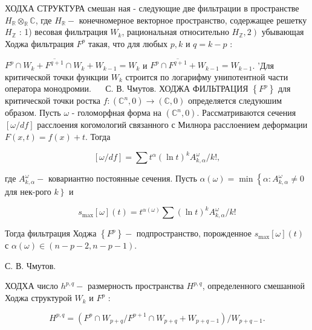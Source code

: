 \documentclass[10pt]{article}
\begin{document}
ХОДХА СТРУКТУРА смешан ная - следующие две фильтрации в пространстве $H_{\mathbb{R}} \otimes_{\mathbb{R}} \mathbb{C}$, где $H_{\mathbb{R}}-$ конечномерное векторное пространство, содержащее решетку $H_{\mathbb{Z}}$ : 1) весовая фильтрация $W_{k}$, рациональная относительно $\left.H_{\mathbb{Z}}, 2\right)$ убывающая Ходжа фильтрация $F^{p}$ такая, что для любых $p, k$ и $q=k-p$ :



$F^{p} \cap W_{k}+\overline{F^{q+1}} \cap W_{k}+W_{k-1}=W_{k}$ и $F^{p} \cap \overline{F^{q+1}}+W_{k-1}=W_{k-1}$. 'Для критической точки функции $W_{k}$ строится по логарифму унипотентной части оператора монодромии. $\quad$ С. В. Чмутов. ХОДЖА ФИЛЬТРАЦИЯ $\left\{F^{p}\right\}$ для критической точки ростка $f:\left(\mathbb{C}^{n}, 0\right) \rightarrow(\mathbb{C}, 0)$ определяется следуюшим образом. Пусть $\omega$ - голоморфная форма на $\left(\mathbb{C}^{n}, 0\right)$. Рассматриваются сечения $[\omega / d f]$ расслоения когомологий связанного с Милнора расслоением деформации $F(x, t)=f(x)+t$. Тогда



\[

[\omega / d f]=\sum t^{\alpha}(\ln t)^{k} A_{k, \alpha}^{\omega} / k !,

\]



где $A_{k, \alpha}^{\omega}-$ ковариантно постоянные сечения. Пусть $\alpha(\omega)=\min \left\{\alpha: A_{k, \alpha}^{\omega} \neq 0\right.$ для нек-рого $\left.k\right\}$ и



\[

s_{\max }[\omega](t)=t^{\alpha(\omega)} \sum(\ln t)^{k} A_{k, \alpha}^{\omega} / k !

\]



Тогда фильтрация Ходжа $\left\{F^{p}\right\}-$ подпространство, порожденное $s_{\max }[\omega](t)$ с $\alpha(\omega) \in(n-p-2, n-p-1)$.



С. В. Чмутов.



ХОДХА число $h^{p, q}-$ размерность пространства $H^{p, q}$, определенного смешанной Ходжа структурой $W_{k}$ и $F^{p}$ :



\[

H^{p, q}=\left(F^{p} \cap W_{p+q} / F^{p+1} \cap W_{p+q}+W_{p+q-1}\right) / W_{p+q-1} .

\]
\end{document}
